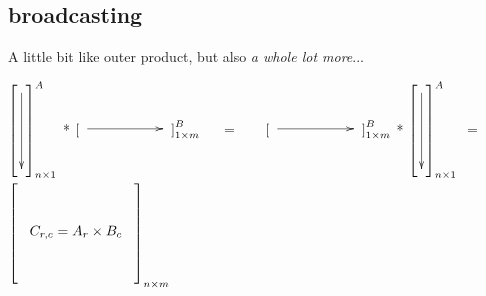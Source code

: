 \documentclass[11pt, oneside]{article}
\begin{document}
    
\subsection{broadcasting}
A little bit like outer product, but also \emph{a whole lot more}...

  
$\left[
\vcenter{\xymatrix{
\ar[dd]\\
\\
\\}}
\right]^A_{n\times 1}$
*\;\;\;\;
$\left[\vcenter{\xymatrix{
\ar[rr] &  &  \\}}
\right]^B_{1\times m} $
$\quad=\quad\;\;$
$\left[\vcenter{\xymatrix{
\ar[rr] &  &  \\}}
\right]^B_{1\times m} $
*\;\;\;
$\left[
\vcenter{\xymatrix{
\ar[dd]\\
\\
\\}}
\right]^A_{n\times 1}$
$=\quad\;$
$\left[
\vcenter{\xymatrix{
 \\
\;\; C_{r,c} = A_{r} \times B_{c} \;\; \\
  \\}}
\right]_{n\times m} $ \\${}$\\
\end{document}
